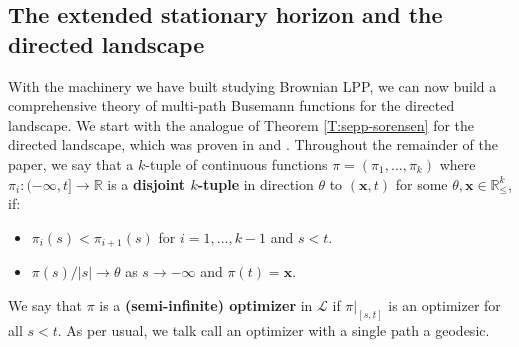\documentclass[11pt]{article}
\newcommand{\R}{\mathbb{R}}
\newcommand{\cL}{\mathcal{L}}
\newcommand{\bx}{\mathbf{x}}
\theoremstyle{definition} %
\theoremstyle{remark} %
\begin{document}
\subsection{The extended stationary horizon and the directed landscape}
\label{SS:extended-multi-horizon}

With the machinery we have built studying Brownian LPP, we can now build a comprehensive theory of multi-path Busemann functions for the directed landscape. We start with the analogue of Theorem \ref{T:sepp-sorensen} for the directed landscape, which was proven in \cite{busani2024stationary} and \cite{rahman2021infinite}. Throughout the remainder of the paper, we say that a $k$-tuple of continuous functions $\pi = (\pi_1, \dots, \pi_k)$ where $\pi_i:(-\infty, t] \to \R$ is a \textbf{disjoint $k$-tuple} in direction $\theta$ to $(\bx, t)$ for some $\theta, \bx \in \R^k_\le$, if:
\begin{itemize}
	\item $\pi_i(s) < \pi_{i+1}(s)$ for $i = 1, \dots, k-1$ and $s < t$.
	\item $\pi(s)/|s| \to \theta$ as $s \to -\infty$ and $\pi(t) = \bx$.
\end{itemize}
We say that $\pi$ is a \textbf{(semi-infinite) optimizer} in $\cL$ if $\pi|_{[s, t]}$ is an optimizer for all $s < t$. As per usual, we talk call an optimizer with a single path a geodesic. 
\end{document}
